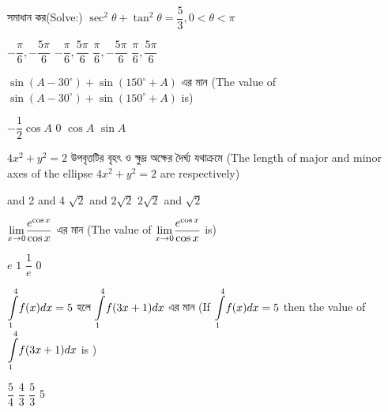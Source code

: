 \documentclass[addpoints]{exam}
\begin{document}
\begin{questions}
\begin{oneparchoices}
\end{oneparchoices}

\question  সমাধান কর(Solve:) $ \sec^{2}\theta + \tan^{2}\theta = \dfrac{5}{3}, 0<\theta<\pi $

\begin{oneparchoices}
\choice $ -\dfrac{\pi}{6}, -\dfrac{5\pi}{6} $
\choice $ -\dfrac{\pi}{6}, \dfrac{5\pi}{6} $
\choice $ \dfrac{\pi}{6}, -\dfrac{5\pi}{6} $
\choice $ \dfrac{\pi}{6}, \dfrac{5\pi}{6} $

\end{oneparchoices}

\question   $ \sin (A-30^{\circ}) + \sin (150^{\circ} +A) $ এর মান (The value of $ \sin (A-30^{\circ}) + \sin (150^{\circ} +A) $ is)

\begin{oneparchoices}
\choice $ -\dfrac{1}{2}\cos A$
\choice $ 0 $
\choice $ \cos A $
\choice $ \sin A $

\end{oneparchoices}

\question   $ 4x^{2} + y^{2} = 2 $ উপবৃত্তটির বৃহৎ ও ক্ষুদ্র অক্ষের দৈর্ঘ্য যথাক্রমে (The length of major and minor axes of the ellipse $ 4x^{2} + y^{2} = 2 $ are respectively)

\begin{oneparchoices}
 and 2
 and 4
\choice $ \sqrt{2}$ and $ 2\sqrt{2} $
\choice $ 2\sqrt{2}$ and $ \sqrt{2} $

\end{oneparchoices}

\question   $ \mathlarger{\lim_{x \to 0}} \dfrac{e^{\cos x}}{\cos x} $ এর মান (The value of $ \mathlarger{\lim_{x \to 0}} \dfrac{e^{\cos x}}{\cos x} $ is)

\begin{oneparchoices}
\choice $e$
\choice $1 $
\choice $ \dfrac{1}{e} $
\choice $ 0 $

\end{oneparchoices}


\question   $ \mathlarger{\int\limits_{1}^{4}} f(x)dx=5$ হলে $ \mathlarger{\int\limits_{1}^{4}} f(3x+1)dx$ এর মান (If $ \mathlarger{\int\limits_{1}^{4}} f(x)dx=5$ then the value of $ \mathlarger{\int\limits_{1}^{4}} f(3x+1)dx$ is )

\begin{oneparchoices}
\choice $\dfrac{5}{4}$
\choice $ \dfrac{4}{3} $
\choice $ \dfrac{5}{3} $
\choice $ 5 $

\end{oneparchoices}


\end{questions}
\end{document}
